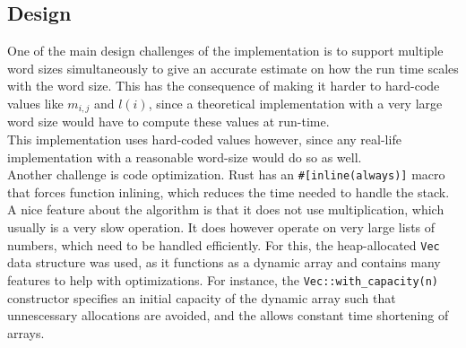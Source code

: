 \subsection{Design}
One of the main design challenges of the implementation is to support multiple word sizes simultaneously to give an accurate estimate on how the run time scales with the word size. This has the consequence of making it harder to hard-code values like $m_{i, j}$ and $l(i)$, since a theoretical implementation with a very large word size would have to compute these values at run-time.\\
This implementation uses hard-coded values however, since any real-life implementation with a reasonable word-size would do so as well.\\
Another challenge is code optimization. Rust has an \texttt{\#[inline(always)]} macro that forces function inlining, which reduces the time needed to handle the stack.
A nice feature about the algorithm is that it does not use multiplication, which usually is a very slow operation. It does however operate on very large lists of numbers, which need to be handled efficiently. For this, the heap-allocated \texttt{Vec} data structure was used, as it functions as a dynamic array and contains many features to help with optimizations. For instance, the \texttt{Vec::with\_capacity(n)} constructor specifies an initial capacity of the dynamic array such that unnescessary allocations are avoided, and the  allows constant time shortening of arrays\cite{rust-lang}.\\

